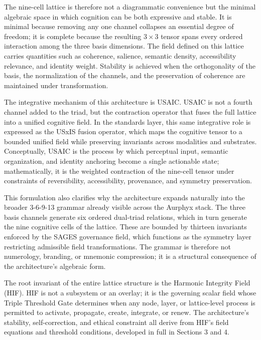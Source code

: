 The nine-cell lattice is therefore not a diagrammatic convenience but the minimal
algebraic space in which cognition can be both expressive and stable. It is minimal
because removing any one channel collapses an essential degree of freedom; it is
complete because the resulting \(3 \times 3\) tensor spans every ordered interaction
among the three basis dimensions. The field defined on this lattice carries
quantities such as coherence, salience, semantic density, accessibility relevance,
and identity weight. Stability is achieved when the orthogonality of the basis, the
normalization of the channels, and the preservation of coherence are maintained
under transformation.

The integrative mechanism of this architecture is USAIC. USAIC is not a fourth
channel added to the triad, but the contraction operator that fuses the full lattice
into a unified cognitive field. In the standards layer, this same integrative role
is expressed as the USxIS fusion operator, which maps the cognitive tensor to a
bounded unified field while preserving invariants across modalities and substrates.
Conceptually, USAIC is the process by which perceptual input, semantic organization,
and identity anchoring become a single actionable state; mathematically, it is the
weighted contraction of the nine-cell tensor under constraints of reversibility,
accessibility, provenance, and symmetry preservation.

This formulation also clarifies why the architecture expands naturally into the
broader 3-6-9-13 grammar already visible across the Aurphyx stack. The three basis
channels generate six ordered dual-triad relations, which in turn generate the nine
cognitive cells of the lattice. These are bounded by thirteen invariants enforced by
the SAGES governance field, which functions as the symmetry layer restricting
admissible field transformations. The grammar is therefore not numerology, branding,
or mnemonic compression; it is a structural consequence of the architecture's
algebraic form.

The root invariant of the entire lattice structure is the Harmonic Integrity Field
(HIF). HIF is not a subsystem or an overlay; it is the governing scalar field whose
Triple Threshold Gate determines when any node, layer, or lattice-level process is
permitted to activate, propagate, create, integrate, or renew. The architecture's
stability, self-correction, and ethical constraint all derive from HIF's field
equations and threshold conditions, developed in full in Sections 3 and 4.

